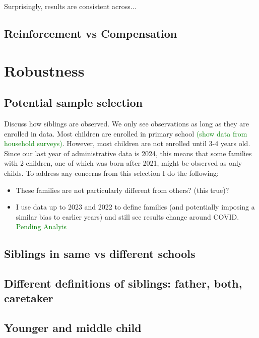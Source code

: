 Surprisingly, results are consistent across...

\subsection{Reinforcement vs Compensation}

\section{Robustness}\label{sec:robustness}

\subsection{Potential sample selection}

Discuss how siblings are observed. We only see observations as long as they are enrolled in data. Most children are enrolled in primary school \textcolor{green}{(show data from household surveys)}. However, most children are not enrolled until 3-4 years old. Since our last year of administrative data is 2024, this means that some families with 2 children, one of which was born after 2021, might be observed as only childs. To address any concerns from this selection I do the following:

\begin{itemize}
    \item These families are not particularly different from others? (this true)?
    \item I use data up to 2023 and 2022 to define families (and potentially imposing a similar bias to earlier years) and still see results change around COVID. \textcolor{green}{Pending Analyis}
\end{itemize}


\subsection{Siblings in same vs different schools}

\subsection{Different definitions of siblings: father, both, caretaker}

\subsection{Younger and middle child}

